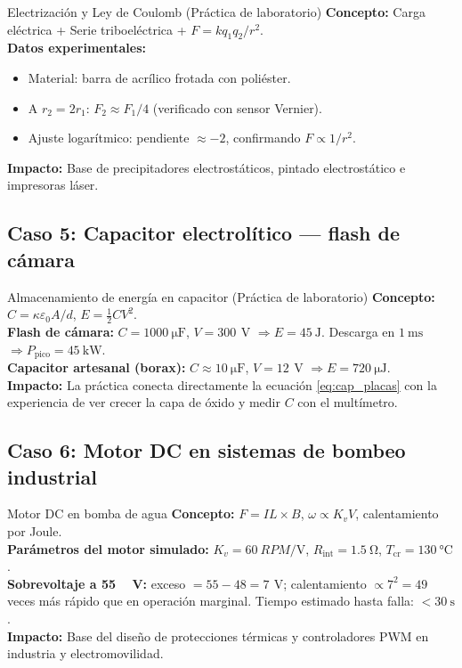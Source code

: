 \documentclass[12pt, a4paper]{article}
\newcommand{\V}{\,\si{\volt}}
\begin{document}
\begin{casodeuso}{Electrización y Ley de Coulomb (Práctica de laboratorio)}
\textbf{Concepto:} Carga eléctrica + Serie triboeléctrica + $F = kq_1q_2/r^2$.\\[4pt]
\textbf{Datos experimentales:}
\begin{itemize}
  \item Material: barra de acrílico frotada con poliéster.
  \item A $r_2 = 2r_1$: $F_2 \approx F_1/4$ (verificado con sensor Vernier).
  \item Ajuste logarítmico: pendiente $\approx -2$, confirmando $F \propto 1/r^2$.
\end{itemize}
\textbf{Impacto:} Base de precipitadores electrostáticos, pintado
electrostático e impresoras láser.
\end{casodeuso}

\subsection{Caso 5: Capacitor electrolítico --- flash de cámara}

\begin{casodeuso}{Almacenamiento de energía en capacitor (Práctica de laboratorio)}
\textbf{Concepto:} $C = \kappa\varepsilon_0 A/d$,\; $E = \tfrac{1}{2}CV^2$.\\[4pt]
\textbf{Flash de cámara:} $C = \SI{1000}{\micro\farad}$, $V = \SI{300}{\V}$
$\Rightarrow E = \SI{45}{\joule}$.
Descarga en $\SI{1}{\milli\second}$ $\Rightarrow P_{\mathrm{pico}} = \SI{45}{\kilo\watt}$.\\[4pt]
\textbf{Capacitor artesanal (borax):} $C \approx \SI{10}{\micro\farad}$, $V = \SI{12}{\V}$
$\Rightarrow E = \SI{720}{\micro\joule}$.\\[4pt]
\textbf{Impacto:} La práctica conecta directamente la ecuación
\eqref{eq:cap_placas} con la experiencia de ver crecer la capa de óxido y
medir $C$ con el multímetro.
\end{casodeuso}

\subsection{Caso 6: Motor DC en sistemas de bombeo industrial}

\begin{casodeuso}{Motor DC en bomba de agua}
\textbf{Concepto:} $F = IL \times B$,\; $\omega \propto K_v V$,\; calentamiento por Joule.\\[4pt]
\textbf{Parámetros del motor simulado:}
$K_v = \SI{60}{RPM\per\volt}$,\; $R_{\mathrm{int}} = \SI{1.5}{\ohm}$,\;
$T_{\mathrm{cr}} = \SI{130}{\celsius}$.\\[4pt]
\textbf{Sobrevoltaje a \SI{55}{\V}:} exceso $= 55 - 48 = \SI{7}{\V}$;
calentamiento $\propto 7^2 = 49$ veces más rápido que en operación
marginal. Tiempo estimado hasta falla: $< \SI{30}{\second}$.\\[4pt]
\textbf{Impacto:} Base del diseño de protecciones térmicas y controladores
PWM en industria y electromovilidad.
\end{casodeuso}
\end{document}
